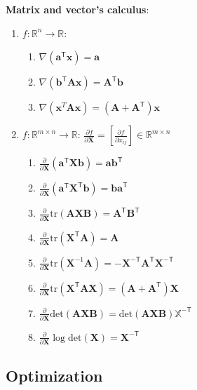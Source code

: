 \textbf{Matrix and vector's calculus}:
\begin{enumerate}[{(1)}]
    \item $f:\mathbb{R}^n\to\mathbb{R}$:
    \begin{enumerate}
        \item $\nabla(\bm{a}^\mathsf{T}\bm{x})=\bm{a}$
        \item $\nabla(\bm{b}^\mathsf{T}\mathbf{A}\bm{x})=\mathbf{A}^\mathsf{T}\bm{b}$
        \item $\nabla(\bm{x}^T\mathbf{A}\bm{x})=(\mathbf{A}+\mathbf{A}^\mathsf{T})\bm{x}$
    \end{enumerate}
    \item $f:\mathbb{R}^{m\times n}\to\mathbb{R}$: $\frac{\partial{f}}{\partial\mathbf{X}}=\left[\frac{\partial{f}}{\partial{x_{ij}}}\right]\in\mathbb{R}^{m\times n}$
    \begin{enumerate}
        \item $\frac{\partial}{\partial{\mathbf{X}}}(\bm{a}^\mathsf{T}\mathbf{X}\bm{b})=\bm{ab}^\mathsf{T}$
        \item $\frac{\partial}{\partial{\mathbf{X}}}(\bm{a}^\mathsf{T}\mathbf{X}^\mathsf{T}\bm{b})=\bm{ba}^\mathsf{T}$
        \item $\frac{\partial}{\partial{\mathbf{X}}}\mathrm{tr}(\mathbf{AXB})=\mathbf{A}^\mathsf{T}\mathbf{B}^\mathsf{T}$
        \item $\frac{\partial}{\partial{\mathbf{X}}}\mathrm{tr}(\mathbf{X}^\mathsf{T}\mathbf{A})=\mathbf{A}$
        \item $\frac{\partial}{\partial{\mathbf{X}}}\mathrm{tr}(\mathbf{X}^{-1}\mathbf{A})=-\mathbf{X}^{-\mathsf{T}}\mathbf{A}^\mathsf{T}\mathbf{X}^{-\mathsf{T}}$
        \item $\frac{\partial}{\partial{\mathbf{X}}}\mathrm{tr}(\mathbf{X}^\mathsf{T}\mathbf{AX})=(\mathbf{A}+\mathbf{A}^\mathsf{T})\mathbf{X}$
        \item $\frac{\partial}{\partial{\mathbf{X}}}\mathrm{det}(\mathbf{AXB})=\mathrm{det}(\mathbf{AXB})\mathbb{X}^{-\mathsf{T}}$
        \item $\frac{\partial}{\partial{\mathbf{X}}}\log\mathrm{det}(\mathbf{X})=\mathbf{X}^{-\mathsf{T}}$
    \end{enumerate}
\end{enumerate}

\subsection{Optimization}

